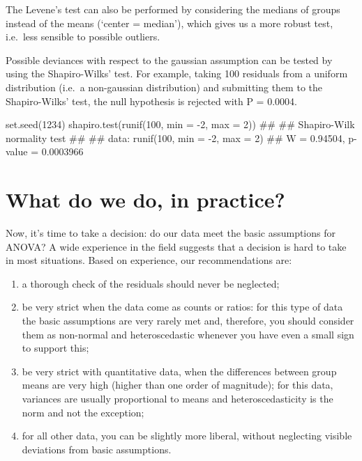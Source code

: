 \documentclass[a4paper,12pt,oneside]{book}
\providecommand{\tightlist}{%
  \setlength{\itemsep}{0pt}\setlength{\parskip}{0pt}}
\newenvironment{Shaded}{\begin{snugshade}}{\end{snugshade}}
\newcommand{\DecValTok}[1]{#1}
\newcommand{\SpecialCharTok}[1]{#1}
\newcommand{\DocumentationTok}[1]{#1}
\newcommand{\FunctionTok}[1]{#1}
\newcommand{\AttributeTok}[1]{#1}
\newcommand{\NormalTok}[1]{#1}
\begin{document}
The Levene's test can also be performed by considering the medians of groups instead of the means (`center = median'), which gives us a more robust test, i.e.~less sensible to possible outliers.

Possible deviances with respect to the gaussian assumption can be tested by using the Shapiro-Wilks' test. For example, taking 100 residuals from a uniform distribution (i.e.~a non-gaussian distribution) and submitting them to the Shapiro-Wilks' test, the null hypothesis is rejected with P = 0.0004.

\begin{Shaded}
\begin{Highlighting}[]
\FunctionTok{set.seed}\NormalTok{(}\DecValTok{1234}\NormalTok{)}
\FunctionTok{shapiro.test}\NormalTok{(}\FunctionTok{runif}\NormalTok{(}\DecValTok{100}\NormalTok{, }\AttributeTok{min =} \SpecialCharTok{{-}}\DecValTok{2}\NormalTok{, }\AttributeTok{max =} \DecValTok{2}\NormalTok{))}
\DocumentationTok{\#\# }
\DocumentationTok{\#\#  Shapiro{-}Wilk normality test}
\DocumentationTok{\#\# }
\DocumentationTok{\#\# data:  runif(100, min = {-}2, max = 2)}
\DocumentationTok{\#\# W = 0.94504, p{-}value = 0.0003966}
\end{Highlighting}
\end{Shaded}

\hypertarget{what-do-we-do-in-practice}{%
\section{What do we do, in practice?}\label{what-do-we-do-in-practice}}

Now, it's time to take a decision: do our data meet the basic assumptions for ANOVA? A wide experience in the field suggests that a decision is hard to take in most situations. Based on experience, our recommendations are:

\begin{enumerate}
\def\labelenumi{\arabic{enumi}.}
\tightlist
\item
  a thorough check of the residuals should never be neglected;
\item
  be very strict when the data come as counts or ratios: for this type of data the basic assumptions are very rarely met and, therefore, you should consider them as non-normal and heteroscedastic whenever you have even a small sign to support this;
\item
  be very strict with quantitative data, when the differences between group means are very high (higher than one order of magnitude); for this data, variances are usually proportional to means and heteroscedasticity is the norm and not the exception;
\item
  for all other data, you can be slightly more liberal, without neglecting visible deviations from basic assumptions.
\end{enumerate}
\end{document}
